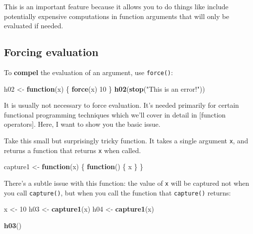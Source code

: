 \documentclass[]{book}
\newenvironment{Shaded}{\begin{snugshade}}{\end{snugshade}}
\newcommand{\KeywordTok}[1]{\textcolor[rgb]{0.13,0.29,0.53}{\textbf{#1}}}
\newcommand{\DecValTok}[1]{\textcolor[rgb]{0.00,0.00,0.81}{#1}}
\newcommand{\StringTok}[1]{\textcolor[rgb]{0.31,0.60,0.02}{#1}}
\newcommand{\ControlFlowTok}[1]{\textcolor[rgb]{0.13,0.29,0.53}{\textbf{#1}}}
\newcommand{\NormalTok}[1]{#1}
\theoremstyle{definition}
\theoremstyle{definition}
\theoremstyle{definition}
\theoremstyle{remark}
\begin{document}
This is an important feature because it allows you to do things like
include potentially expensive computations in function arguments that
will only be evaluated if needed.

\subsection{Forcing evaluation}\label{forcing-evaluation}

To \textbf{compel} the evaluation of an argument, use \texttt{force()}:

\begin{Shaded}
\begin{Highlighting}[]
\NormalTok{h02 <-}\StringTok{ }\ControlFlowTok{function}\NormalTok{(x) \{}
  \KeywordTok{force}\NormalTok{(x)}
  \DecValTok{10}
\NormalTok{\}}
\KeywordTok{h02}\NormalTok{(}\KeywordTok{stop}\NormalTok{(}\StringTok{"This is an error!"}\NormalTok{))}
\end{Highlighting}
\end{Shaded}

It is usually not necessary to force evaluation. It's needed primarily
for certain functional programming techniques which we'll cover in
detail in {[}function operators{]}. Here, I want to show you the basic
issue.

Take this small but surprisingly tricky function. It takes a single
argument \texttt{x}, and returns a function that returns \texttt{x} when
called.

\begin{Shaded}
\begin{Highlighting}[]
\NormalTok{capture1 <-}\StringTok{ }\ControlFlowTok{function}\NormalTok{(x) \{}
  \ControlFlowTok{function}\NormalTok{() \{}
\NormalTok{    x}
\NormalTok{  \}}
\NormalTok{\}}
\end{Highlighting}
\end{Shaded}

There's a subtle issue with this function: the value of \texttt{x} will
be captured not when you call \texttt{capture()}, but when you call the
function that \texttt{capture()} returns:

\begin{Shaded}
\begin{Highlighting}[]
\NormalTok{x <-}\StringTok{ }\DecValTok{10}
\NormalTok{h03 <-}\StringTok{ }\KeywordTok{capture1}\NormalTok{(x)}
\NormalTok{h04 <-}\StringTok{ }\KeywordTok{capture1}\NormalTok{(x)}

\KeywordTok{h03}\NormalTok{()}
\end{Highlighting}
\end{Shaded}
\end{document}
